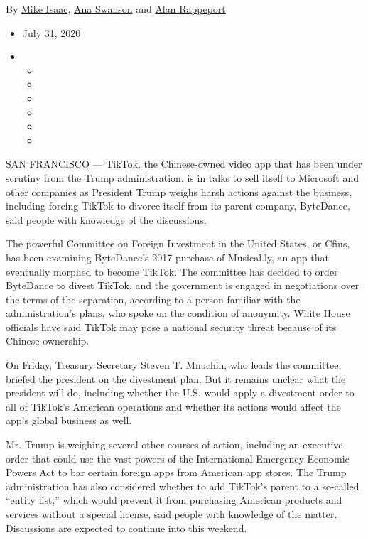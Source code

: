 By \href{https://www.nytimes3xbfgragh.onion/by/mike-isaac}{Mike Isaac},
\href{https://www.nytimes3xbfgragh.onion/by/ana-swanson}{Ana Swanson}
and \href{https://www.nytimes3xbfgragh.onion/by/alan-rappeport}{Alan
Rappeport}

\begin{itemize}
\item
  July 31, 2020
\item
  \begin{itemize}
  \item
  \item
  \item
  \item
  \item
  \item
  \end{itemize}
\end{itemize}

SAN FRANCISCO --- TikTok, the Chinese-owned video app that has been
under scrutiny from the Trump administration, is in talks to sell itself
to Microsoft and other companies as President Trump weighs harsh actions
against the business, including forcing TikTok to divorce itself from
its parent company, ByteDance, said people with knowledge of the
discussions.

The powerful Committee on Foreign Investment in the United States, or
Cfius, has been examining ByteDance's 2017 purchase of Musical.ly, an
app that eventually morphed to become TikTok. The committee has decided
to order ByteDance to divest TikTok, and the government is engaged in
negotiations over the terms of the separation, according to a person
familiar with the administration's plans, who spoke on the condition of
anonymity. White House officials have said TikTok may pose a national
security threat because of its Chinese ownership.

On Friday, Treasury Secretary Steven T. Mnuchin, who leads the
committee, briefed the president on the divestment plan. But it remains
unclear what the president will do, including whether the U.S. would
apply a divestment order to all of TikTok's American operations and
whether its actions would affect the app's global business as well.

Mr. Trump is weighing several other courses of action, including an
executive order that could use the vast powers of the International
Emergency Economic Powers Act to bar certain foreign apps from American
app stores. The Trump administration has also considered whether to add
TikTok's parent to a so-called ``entity list,'' which would prevent it
from purchasing American products and services without a special
license, said people with knowledge of the matter. Discussions are
expected to continue into this weekend.

